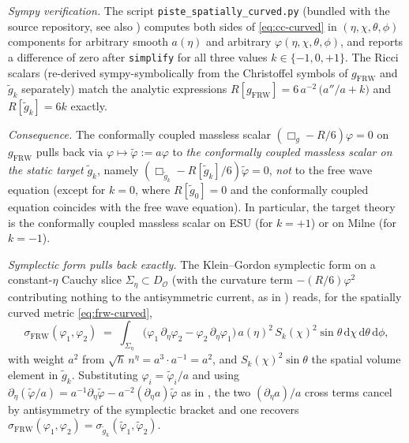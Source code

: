 \documentclass[11pt]{article}
\theoremstyle{definition}
\newcommand{\OO}{\mathcal{O}}
\newcommand{\FRW}{\mathrm{FRW}}
\begin{document}
\smallskip

\noindent\emph{Sympy verification.} The script
\texttt{piste\_spatially\_curved.py} (bundled with the source repository,
see also \cite{Remondiere2026}) computes both sides of \eqref{eq:cc-curved}
in $(\eta,\chi,\theta,\phi)$ components for arbitrary smooth $a(\eta)$ and
arbitrary $\varphi(\eta,\chi,\theta,\phi)$, and reports a difference of zero
after \texttt{simplify} for all three values $k\in\{-1,0,+1\}$. The Ricci
scalars (re-derived sympy-symbolically from the Christoffel symbols of
$g_\FRW$ and $\tilde g_k$ separately) match the analytic expressions
$R[g_\FRW] = 6\,a^{-2}\,\big(a''/a + k\big)$ and $R[\tilde g_k]=6k$
exactly.

\smallskip

\noindent\emph{Consequence.} The conformally coupled massless scalar
$(\Box_g-R/6)\varphi=0$ on $g_\FRW$ pulls back via $\varphi\mapsto
\tilde\varphi:=a\varphi$ to \emph{the conformally coupled massless scalar on
the static target} $\tilde g_k$, namely
$(\Box_{\tilde g_k}-R[\tilde g_k]/6)\tilde\varphi=0$, \emph{not} to the free
wave equation (except for $k=0$, where $R[\tilde g_0]=0$ and the conformally
coupled equation coincides with the free wave equation). In particular, the
target theory is the conformally coupled massless scalar on ESU (for $k=+1$)
or on Milne (for $k=-1$).

\smallskip

\noindent\emph{Symplectic form pulls back exactly.} The Klein--Gordon
symplectic form on a constant-$\eta$ Cauchy slice $\Sigma_\eta\subset
D_\OO$ (with the curvature term $-(R/6)\varphi^2$ contributing nothing to
the antisymmetric current, as in
\cite[\S3.1(b)]{Remondiere2026}) reads, for the spatially curved metric
\eqref{eq:frw-curved},
\begin{equation}\label{eq:sigma-curved}
\sigma_\FRW(\varphi_1,\varphi_2)
\;=\; \int_{\Sigma_\eta}\big(\varphi_1\,\partial_\eta\varphi_2
                            -\varphi_2\,\partial_\eta\varphi_1\big)\,
        a(\eta)^2\,S_k(\chi)^2\sin\theta\,
        \mathrm{d}\chi\,\mathrm{d}\theta\,\mathrm{d}\phi,
\end{equation}
with weight $a^2$ from $\sqrt{h}\,n^\eta=a^3\cdot a^{-1}=a^2$, and
$S_k(\chi)^2\sin\theta$ the spatial volume element in $\tilde g_k$.
Substituting $\varphi_i=\tilde\varphi_i/a$ and using
$\partial_\eta(\tilde\varphi/a)=a^{-1}\partial_\eta\tilde\varphi
-a^{-2}(\partial_\eta a)\tilde\varphi$ as in
\cite[\S3.1(b)]{Remondiere2026}, the two
$(\partial_\eta a)/a$ cross terms cancel by antisymmetry of the symplectic
bracket and one recovers $\sigma_\FRW(\varphi_1,\varphi_2)
=\sigma_{\tilde g_k}(\tilde\varphi_1,\tilde\varphi_2)$.
\end{document}
